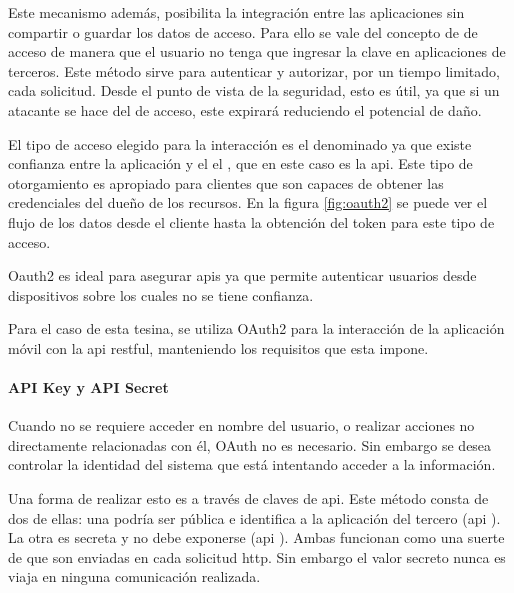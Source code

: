 Este mecanismo además, posibilita la integración entre las aplicaciones sin compartir o guardar los datos de acceso. Para ello se vale del concepto de  de acceso de manera que el usuario no tenga que ingresar la clave en aplicaciones de terceros. Este método sirve para autenticar y autorizar, por un tiempo limitado, cada solicitud. Desde el punto de vista de la seguridad, esto es útil, ya que si un atacante se hace del  de acceso, este expirará reduciendo el potencial de daño.

El tipo de acceso elegido para la interacción  es el denominado  ya que existe confianza entre la aplicación y el el , que en este caso es la \gls{api}. Este tipo de otorgamiento es apropiado para clientes que son capaces de obtener las credenciales del dueño de los recursos\cite{hardt2012oauth}.
En la figura \ref{fig:oauth2} se puede ver el flujo de los datos desde el cliente hasta la obtención del token para este tipo de acceso.


Oauth2 es ideal para asegurar \glspl{api} ya que permite autenticar usuarios desde dispositivos sobre los cuales no se tiene confianza\cite{degges2015ApiSecurity}. 

Para el caso de esta tesina, se utiliza OAuth2 para la interacción de la aplicación móvil con la \gls{api} \gls{restful}, manteniendo los requisitos que esta impone.

\paragraph{API Key y API Secret}
\label{apikey}
Cuando no se requiere acceder en nombre del usuario, o realizar acciones no directamente relacionadas con él, OAuth no es necesario. Sin embargo se desea controlar la identidad del sistema que está intentando acceder a la información. 

Una forma de realizar esto es a través de claves de \gls{api}. Este método consta de dos de ellas: una podría ser pública e identifica a la aplicación del tercero (\gls{api} ). La otra es secreta y no debe exponerse (\gls{api} ). Ambas funcionan como una suerte de  que son enviadas en cada solicitud \gls{http}. Sin embargo el valor secreto nunca es viaja en ninguna comunicación realizada.

